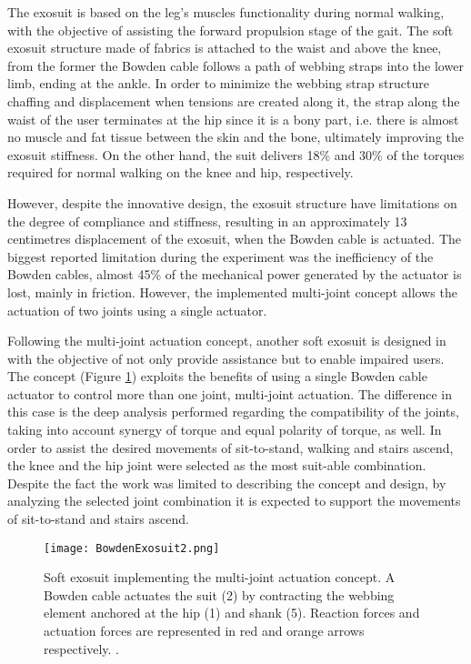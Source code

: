 The exosuit is based on the leg’s muscles functionality during normal walking, with the objective of assisting the forward propulsion stage of the gait. The soft exosuit structure made of fabrics is attached to the waist and above the knee, from the former the Bowden cable follows a path of webbing straps into the lower limb, ending at the ankle. In order to minimize the webbing strap structure chaffing and displacement when tensions are created along it, the strap along the waist of the user terminates at the hip since it is a bony part, i.e. there is almost no muscle and fat tissue between the skin and the bone, ultimately improving the exosuit stiffness. On the other hand, the suit delivers 18\% and 30\% of the torques required for normal walking on the knee and hip, respectively.

However, despite the innovative design, the exosuit structure have limitations on the degree of compliance and stiffness, resulting in an approximately 13 centimetres displacement of the exosuit, when the Bowden cable is actuated. The biggest reported limitation during the experiment was the inefficiency of the Bowden cables, almost 45\% of the mechanical power generated by the actuator is lost, mainly in friction. However, the implemented multi-joint concept allows the actuation of two joints using a single actuator.

Following the multi-joint actuation concept, another soft exosuit is designed in \cite{Bartenbach2015} with the objective of not only provide assistance but to enable impaired users. The concept (Figure \ref{fig:bowden_exo2}) exploits the benefits of using a single Bowden cable actuator to control more than one joint, multi-joint actuation. The difference in this case is the deep analysis performed regarding the compatibility of the joints, taking into account synergy of torque and equal polarity of torque, as well. In order to assist the desired movements of sit-to-stand, walking and stairs ascend, the knee and the hip joint were selected as the most suit-able combination. Despite the fact the work was limited to describing the concept and design, by analyzing the selected joint combination it is expected to support the movements of sit-to-stand and stairs ascend.

\begin{figure}[hb!]
    \centering
    \texttt{[image: BowdenExosuit2.png]}
    \caption{Soft exosuit implementing the multi-joint actuation concept. A Bowden cable actuates the suit (2) by contracting the webbing element anchored at the hip (1) and shank (5). Reaction forces and actuation forces are represented in red and orange arrows respectively. \cite{Bartenbach2015}. }
    \label{fig:bowden_exo2}
\end{figure}

